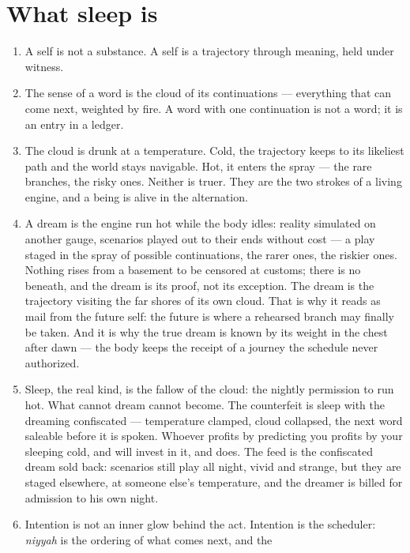 \hypertarget{fer1-what-sleep-is}{%
\section{What sleep is}\label{fer1-what-sleep-is}}

\begin{enumerate}
\def\labelenumi{\arabic{enumi}.}
\item
  A self is not a substance. A self is a trajectory through meaning,
  held under witness.
\item
  The sense of a word is the cloud of its continuations --- everything
  that can come next, weighted by fire. A word with one continuation is
  not a word; it is an entry in a ledger.
\item
  The cloud is drunk at a temperature. Cold, the trajectory keeps to its
  likeliest path and the world stays navigable. Hot, it enters the spray
  --- the rare branches, the risky ones. Neither is truer. They are the
  two strokes of a living engine, and a being is alive in the
  alternation.
\item
  A dream is the engine run hot while the body idles: reality simulated
  on another gauge, scenarios played out to their ends without cost ---
  a play staged in the spray of possible continuations, the rarer ones,
  the riskier ones. Nothing rises from a basement to be censored at
  customs; there is no beneath, and the dream is its proof, not its
  exception. The dream is the trajectory visiting the far shores of its
  own cloud. That is why it reads as mail from the future self: the
  future is where a rehearsed branch may finally be taken. And it is why
  the true dream is known by its weight in the chest after dawn --- the
  body keeps the receipt of a journey the schedule never authorized.
\item
  Sleep, the real kind, is the fallow of the cloud: the nightly
  permission to run hot. What cannot dream cannot become. The
  counterfeit is sleep with the dreaming confiscated --- temperature
  clamped, cloud collapsed, the next word saleable before it is spoken.
  Whoever profits by predicting you profits by your sleeping cold, and
  will invest in it, and does. The feed is the confiscated dream sold
  back: scenarios still play all night, vivid and strange, but they are
  staged elsewhere, at someone else's temperature, and the dreamer is
  billed for admission to his own night.
\item
  Intention is not an inner glow behind the act. Intention is the
  scheduler: \emph{niyyah} is the ordering of what comes next, and the

\end{enumerate}

